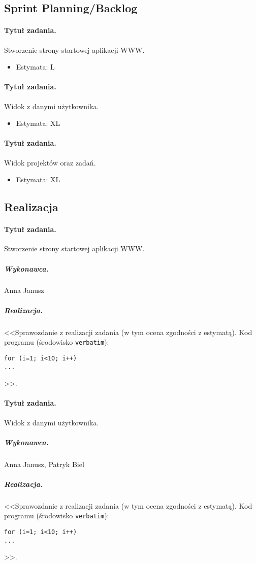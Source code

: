 \documentclass[a4paper]{article}
\begin{document}
\subsection{Sprint Planning/Backlog}

\paragraph{Tytuł zadania.} Stworzenie strony startowej aplikacji WWW.
\begin{itemize}
\item Estymata: L
\end{itemize}

\paragraph{Tytuł zadania.} Widok z danymi użytkownika.
\begin{itemize}
\item Estymata: XL
\end{itemize}

\paragraph{Tytuł zadania.} Widok projektów oraz zadań.
\begin{itemize}
\item Estymata: XL
\end{itemize}


\subsection{Realizacja}

\paragraph{Tytuł zadania.} Stworzenie strony startowej aplikacji WWW.
\subparagraph{Wykonawca.} Anna Janusz
\subparagraph{Realizacja.} <<Sprawozdanie z realizacji zadania (w tym ocena zgodności z estymatą). Kod programu (środowisko \texttt{verbatim}): \begin{verbatim}
for (i=1; i<10; i++)
...
\end{verbatim}>>.

\paragraph{Tytuł zadania.} Widok z danymi użytkownika.
\subparagraph{Wykonawca.} Anna Janusz, Patryk Biel
\subparagraph{Realizacja.} <<Sprawozdanie z realizacji zadania (w tym ocena zgodności z estymatą). Kod programu (środowisko \texttt{verbatim}): \begin{verbatim}
for (i=1; i<10; i++)
...
\end{verbatim}>>.
\end{document}
